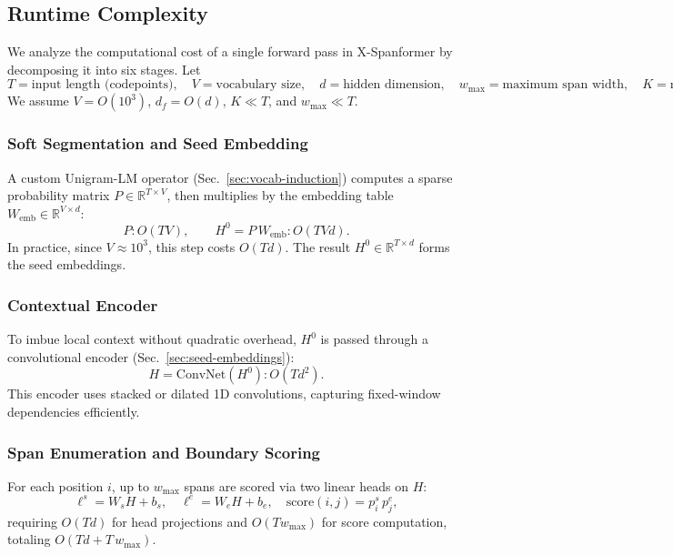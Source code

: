 \subsection{Runtime Complexity}
\label{sec:runtime-complexity}

We analyze the computational cost of a single forward pass in X-Spanformer by decomposing it into six stages. Let
\[
T = \text{input length (codepoints)},\quad
V = \text{vocabulary size},\quad
d = \text{hidden dimension},\quad
w_{\max} = \text{maximum span width},\quad
K = \text{number of retained spans},\quad
d_f = \text{MLP hidden dim},\quad
\eta \in \{0,1\} = \text{prefix token flag}.
\]
We assume \(V=O(10^3)\), \(d_f = O(d)\), \(K\ll T\), and \(w_{\max}\ll T\).

\subsubsection{Soft Segmentation and Seed Embedding}

A custom Unigram-LM operator (Sec.~\ref{sec:vocab-induction}) computes a sparse probability matrix \(P\in\mathbb{R}^{T\times V}\), then multiplies by the embedding table \(W_{\mathrm{emb}}\in\mathbb{R}^{V\times d}\):
\[
P: O(TV), 
\qquad
H^0 = P\,W_{\mathrm{emb}}: O(TVd).
\]
In practice, since \(V\approx10^3\), this step costs \(O(Td)\). The result \(H^0\in\mathbb{R}^{T\times d}\) forms the seed embeddings.

\subsubsection{Contextual Encoder}

To imbue local context without quadratic overhead, \(H^0\) is passed through a convolutional encoder (Sec.~\ref{sec:seed-embeddings}):
\[
H = \mathrm{ConvNet}(H^0): O(Td^2).
\]
This encoder uses stacked or dilated 1D convolutions, capturing fixed-window dependencies efficiently.

\subsubsection{Span Enumeration and Boundary Scoring}

For each position \(i\), up to \(w_{\max}\) spans are scored via two linear heads on \(H\):
\[
\ell^s = W_s H + b_s,\quad
\ell^e = W_e H + b_e,\quad
\mathrm{score}(i,j)=p^s_i\,p^e_j,
\]
requiring \(O(Td)\) for head projections and \(O(Tw_{\max})\) for score computation, totaling \(O(Td + T\,w_{\max})\).

